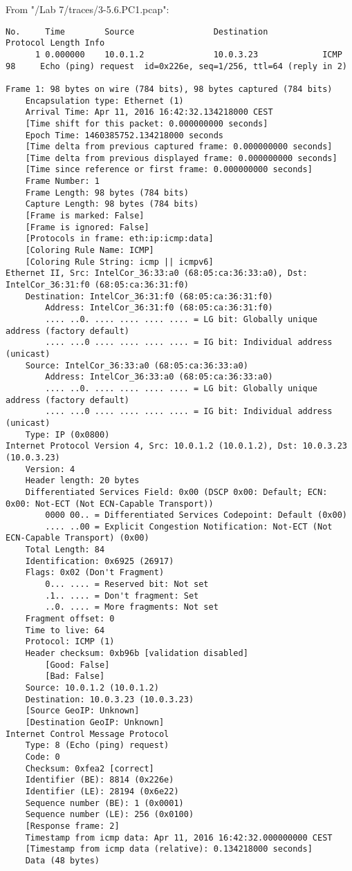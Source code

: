 From "/Lab 7/traces/3-5.6.PC1.pcap":
\begin{lstlisting}
No.     Time        Source                Destination           Protocol Length Info
      1 0.000000    10.0.1.2              10.0.3.23             ICMP     98     Echo (ping) request  id=0x226e, seq=1/256, ttl=64 (reply in 2)

Frame 1: 98 bytes on wire (784 bits), 98 bytes captured (784 bits)
    Encapsulation type: Ethernet (1)
    Arrival Time: Apr 11, 2016 16:42:32.134218000 CEST
    [Time shift for this packet: 0.000000000 seconds]
    Epoch Time: 1460385752.134218000 seconds
    [Time delta from previous captured frame: 0.000000000 seconds]
    [Time delta from previous displayed frame: 0.000000000 seconds]
    [Time since reference or first frame: 0.000000000 seconds]
    Frame Number: 1
    Frame Length: 98 bytes (784 bits)
    Capture Length: 98 bytes (784 bits)
    [Frame is marked: False]
    [Frame is ignored: False]
    [Protocols in frame: eth:ip:icmp:data]
    [Coloring Rule Name: ICMP]
    [Coloring Rule String: icmp || icmpv6]
Ethernet II, Src: IntelCor_36:33:a0 (68:05:ca:36:33:a0), Dst: IntelCor_36:31:f0 (68:05:ca:36:31:f0)
    Destination: IntelCor_36:31:f0 (68:05:ca:36:31:f0)
        Address: IntelCor_36:31:f0 (68:05:ca:36:31:f0)
        .... ..0. .... .... .... .... = LG bit: Globally unique address (factory default)
        .... ...0 .... .... .... .... = IG bit: Individual address (unicast)
    Source: IntelCor_36:33:a0 (68:05:ca:36:33:a0)
        Address: IntelCor_36:33:a0 (68:05:ca:36:33:a0)
        .... ..0. .... .... .... .... = LG bit: Globally unique address (factory default)
        .... ...0 .... .... .... .... = IG bit: Individual address (unicast)
    Type: IP (0x0800)
Internet Protocol Version 4, Src: 10.0.1.2 (10.0.1.2), Dst: 10.0.3.23 (10.0.3.23)
    Version: 4
    Header length: 20 bytes
    Differentiated Services Field: 0x00 (DSCP 0x00: Default; ECN: 0x00: Not-ECT (Not ECN-Capable Transport))
        0000 00.. = Differentiated Services Codepoint: Default (0x00)
        .... ..00 = Explicit Congestion Notification: Not-ECT (Not ECN-Capable Transport) (0x00)
    Total Length: 84
    Identification: 0x6925 (26917)
    Flags: 0x02 (Don't Fragment)
        0... .... = Reserved bit: Not set
        .1.. .... = Don't fragment: Set
        ..0. .... = More fragments: Not set
    Fragment offset: 0
    Time to live: 64
    Protocol: ICMP (1)
    Header checksum: 0xb96b [validation disabled]
        [Good: False]
        [Bad: False]
    Source: 10.0.1.2 (10.0.1.2)
    Destination: 10.0.3.23 (10.0.3.23)
    [Source GeoIP: Unknown]
    [Destination GeoIP: Unknown]
Internet Control Message Protocol
    Type: 8 (Echo (ping) request)
    Code: 0
    Checksum: 0xfea2 [correct]
    Identifier (BE): 8814 (0x226e)
    Identifier (LE): 28194 (0x6e22)
    Sequence number (BE): 1 (0x0001)
    Sequence number (LE): 256 (0x0100)
    [Response frame: 2]
    Timestamp from icmp data: Apr 11, 2016 16:42:32.000000000 CEST
    [Timestamp from icmp data (relative): 0.134218000 seconds]
    Data (48 bytes)


\end{lstlisting}
